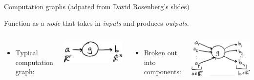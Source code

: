 \documentclass[usenames,dvipsnames,notes,11pt,aspectratio=169,hyperref={colorlinks=true, linkcolor=blue}]{beamer}
\newcommand{\pdfnote}[1]{}
\begin{document}
\begin{frame}
{Computation graphs}
    {(adpated from David Rosenberg's slides)}

Function as a \emph{node} that takes in \emph{inputs} and produces \emph{outputs}.

\begin{columns}[t]
\begin{itemize}
\item Typical computation graph:
\end{itemize}
\includegraphics[scale=0.05]{figures/one-fn-comp-graph}

\begin{itemize}
\item Broken out into components:
\end{itemize}
\includegraphics[scale=0.05]{figures/one-fn-comp-graph-partials}
\end{columns}

    \pdfnote{
CG is a useful abstraction for gradient computation on neural networks and implement neural network softwares.
    }
\end{frame}
\end{document}
